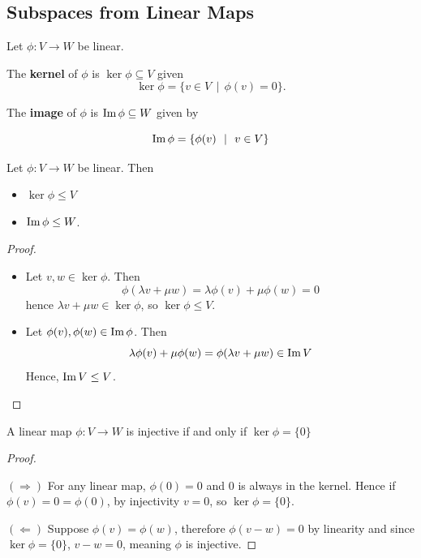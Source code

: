 \subsection{Subspaces from Linear Maps}
\begin{definition} Let $\phi : V  \rightarrow W$ be linear.

  The {\bf kernel} of $\phi$ is $\ker \phi \subseteq V$ given
    \[\ker\phi = \{v \in V \ \ | \ \ \phi(v) = 0\}.\]

    The {\bf image} of $\phi$ is $\operatorname{Im} \phi \subseteq W$ given by

    \[\operatorname{Im} \phi = \{ \phi(v) \ \ | \ \ v \in V\}\]
    
\end{definition}

\begin{prop} Let $\phi : V \rightarrow W$ be linear. Then

    \begin{itemize}
        \item $\ker \phi \leq V$
        \item $\operatorname{Im} \phi \leq W$.
    \end{itemize}
    
\end{prop}
\begin{proof} $ $
  \begin{itemize}
      
  \item Let $v, w \in \ker \phi$. Then
    \[\phi(\lambda v + \mu w) = \lambda \phi(v) + \mu \phi(w) = 0\]
    hence $\lambda v + \mu w \in \ker \phi$, so $\ker \phi \leq V$.
  \item Let $\phi(v), \phi(w) \in \operatorname{Im} \phi$. Then
    \[\lambda \phi(v) + \mu \phi(w) = \phi(\lambda v + \mu w) \in \operatorname{Im} V\]
    Hence, $\operatorname{Im} V \leq V$.
    \end{itemize}
\end{proof}

\begin{prop}
    A linear map $\phi : V \rightarrow W$ is injective if and only if $\ker \phi = \{0\}$
\end{prop}
\begin{proof} $ $

  $(\Rightarrow)$ For any linear map, $\phi(0) = 0$ and $0$ is always in the kernel. Hence if $\phi(v) = 0 = \phi(0)$, by injectivity $v = 0$, so $\ker \phi = \{0\}$.

  $(\Leftarrow)$ Suppose $\phi(v) = \phi(w)$, therefore $\phi(v - w) = 0$ by linearity and since $\ker \phi = \{0\}$, $v - w = 0$, meaning $\phi$ is injective.
\end{proof}

